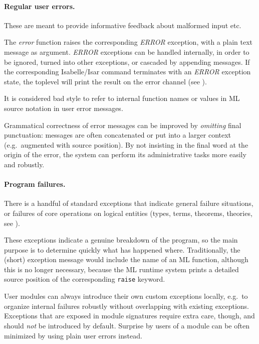 \begin{isabellebody}
\begin{isamarkuptext}
  \paragraph{Regular user errors.}  These are meant to provide
  informative feedback about malformed input etc.

  The \emph{error} function raises the corresponding \emph{ERROR}
  exception, with a plain text message as argument.  \emph{ERROR}
  exceptions can be handled internally, in order to be ignored, turned
  into other exceptions, or cascaded by appending messages.  If the
  corresponding Isabelle/Isar command terminates with an \emph{ERROR}
  exception state, the toplevel will print the result on the error
  channel (see ).

  It is considered bad style to refer to internal function names or
  values in ML source notation in user error messages.

  Grammatical correctness of error messages can be improved by
  \emph{omitting} final punctuation: messages are often concatenated
  or put into a larger context (e.g.\ augmented with source position).
  By not insisting in the final word at the origin of the error, the
  system can perform its administrative tasks more easily and
  robustly.

  \paragraph{Program failures.}  There is a handful of standard
  exceptions that indicate general failure situations, or failures of
  core operations on logical entities (types, terms, theorems,
  theories, see ).

  These exceptions indicate a genuine breakdown of the program, so the
  main purpose is to determine quickly what has happened where.
  Traditionally, the (short) exception message would include the name
  of an ML function, although this is no longer necessary, because the
  ML runtime system prints a detailed source position of the
  corresponding \verb|raise| keyword.

  \medskip User modules can always introduce their own custom
  exceptions locally, e.g.\ to organize internal failures robustly
  without overlapping with existing exceptions.  Exceptions that are
  exposed in module signatures require extra care, though, and should
  \emph{not} be introduced by default.  Surprise by users of a module
  can be often minimized by using plain user errors instead.


\end{isamarkuptext}
\end{isabellebody}
